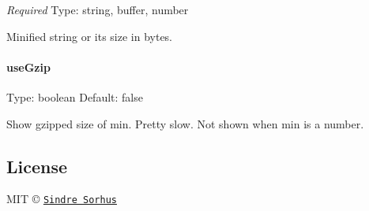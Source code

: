 {\itshape Required} Type\+: {\ttfamily string}, {\ttfamily buffer}, {\ttfamily number}

Minified string or its size in bytes.

\paragraph*{use\+Gzip}

Type\+: {\ttfamily boolean} Default\+: {\ttfamily false}

Show gzipped size of {\ttfamily min}. Pretty slow. Not shown when {\ttfamily min} is a {\ttfamily number}.

\subsection*{License}

M\+IT © \href{http://sindresorhus.com}{\tt Sindre Sorhus} 